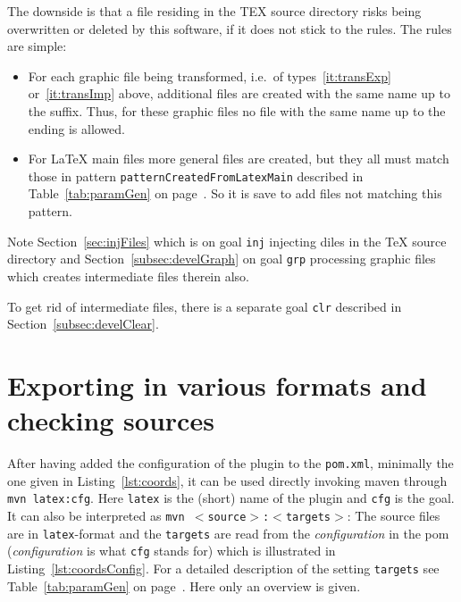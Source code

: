 The downside is that a file residing in the TEX source directory 
risks being overwritten or deleted by this software, 
if it does not stick to the rules. 
The rules are simple: 
%
\begin{itemize}
\item
For each graphic file being transformed, 
i.e.~of types~\ref{it:transExp} or~\ref{it:transImp} above, 
additional files are created with the same name up to the suffix. 
Thus, for these graphic files no file with the same name 
up to the ending is allowed. 
\item
For \LaTeX{} main files more general files are created, 
but they all must match those in pattern \texttt{patternCreatedFromLatexMain} 
described in Table~\ref{tab:paramGen} on page~\pageref{tab:paramGen}. 
So it is save to add files not matching this pattern. 
\end{itemize}


Note Section~\ref{sec:injFiles}  which is on goal \texttt{inj} 
injecting diles in the \TeX{} source directory and 
Section~\ref{subsec:develGraph} on goal \texttt{grp} 
processing graphic files which creates intermediate files therein also. 

To get rid of intermediate files, there is a separate goal \texttt{clr} 
described in Section~\ref{subsec:develClear}. 




\section{Exporting in various formats and checking sources}\label{sec:outputFormats}



After having added the configuration of the plugin to the \texttt{pom.xml},
minimally the one given in Listing~\ref{lst:coords},
it can be used directly invoking maven through 
\texttt{mvn latex:cfg}. 
Here \texttt{latex} is the (short) name of the plugin 
and \texttt{cfg} is the goal. 
It can also be interpreted as \texttt{mvn $<$source$>$:$<$targets$>$}: 
The source files are in \texttt{latex}-format and the \texttt{targets} 
are read from the \emph{configuration} in the pom 
(\emph{configuration} is what \texttt{cfg} stands for) 
which is illustrated in Listing~\ref{lst:coordsConfig}. 
For a detailed description of the setting \texttt{targets} 
see Table~\ref{tab:paramGen} on page~\pageref{tab:paramGen}. 
Here only an overview is given. 

